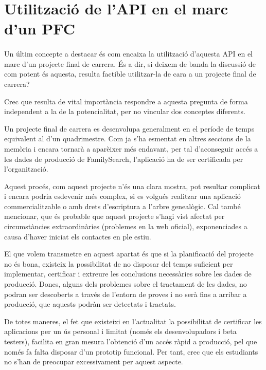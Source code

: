 \section{Utilització de l'API en el marc d'un PFC}

    \paragraph{}
    Un últim concepte a destacar és com encaixa la utilització d'aquesta API en el marc d'un projecte final de carrera. És a dir, si deixem de banda la discussió de com potent és aquesta, resulta factible utilitzar-la de cara a un projecte final de carrera?

    Crec que resulta de vital importància respondre a aquesta pregunta de forma independent a la de la potencialitat, per no vincular dos conceptes diferents.

    Un projecte final de carrera es desenvolupa generalment en el període de temps equivalent al d'un quadrimestre. Com ja s'ha esmentat en altres seccions de la memòria i encara tornarà a aparèixer més endavant, per tal d'aconseguir accés a les dades de producció de FamilySearch, l'aplicació ha de ser certificada per l'organització.

    Aquest procés, com aquest projecte n'és una clara mostra, pot resultar complicat i encara podria esdevenir més complex, si es volgués realitzar una aplicació commercialitzable o amb drets d'escriptura a l'arbre genealògic. Cal també mencionar, que és probable que aquest projecte s'hagi vist afectat per circumstàncies extraordinàries (problemes en la web oficial), exponenciades a causa d'haver iniciat els contactes en ple estiu.

    El que volem transmetre en aquest apartat és que si la planificació del projecte no és bona, existeix la possibilitat de no disposar del temps suficient per implementar, certificar i extreure les conclusions necessàries sobre les dades de producció. Doncs, alguns dels problemes sobre el tractament de les dades, no podran ser descoberts a través de l'entorn de proves i no serà fins a arribar a producció, que aquests podràn ser detectats i tractats.

    De totes maneres, el fet que existeixi en l'actualitat la possibilitat de certificar les aplicacions per un ús personal i limitat (només els desenvolupadors i beta testers), facilita en gran mesura l'obtenció d'un accés ràpid a producció, pel que només fa falta disposar d'un prototip funcional. Per tant, crec que els estudiants no s'han de preocupar excessivament per aquest aspecte.

